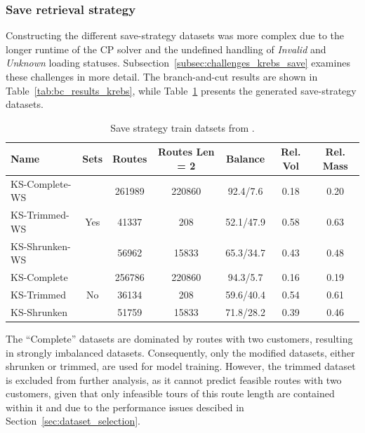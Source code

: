 \subsubsection{Save retrieval strategy}

Constructing the different save-strategy datasets was more complex due to the longer runtime of the \gls{CP} solver and the undefined
handling of \textit{Invalid} and \textit{Unknown} loading statuses. Subsection~\ref{subsec:challenges_krebs_save} examines these
challenges in more detail. The branch-and-cut results are shown in Table~\ref{tab:bc_results_krebs}, while
Table~\ref{tab:saved_instances_krebs} presents the generated save-strategy datasets.

\begin{table}[ht]
    \centering
    \small
    \begin{tabular}{l c c c c c c }
        \toprule
        Name           & Sets                 & Routes & Routes Len = 2 & Balance   & Rel. Vol & Rel. Mass \\
        \midrule
        KS-Complete-WS & \multirow{3}{*}{Yes} & 261989 & 220860         & 92.4/7.6  & 0.18     & 0.20      \\
        KS-Trimmed-WS  &                      & 41337  & 208            & 52.1/47.9 & 0.58     & 0.63      \\
        KS-Shrunken-WS &                      & 56962  & 15833          & 65.3/34.7 & 0.43     & 0.48      \\        \midrule
        KS-Complete    & \multirow{3}{*}{No}  & 256786 & 220860         & 94.3/5.7  & 0.16     & 0.19      \\
        KS-Trimmed     &                      & 36134  & 208            & 59.6/40.4 & 0.54     & 0.61      \\
        KS-Shrunken    &                      & 51759  & 15833          & 71.8/28.2 & 0.39     & 0.46      \\

        \bottomrule
    \end{tabular}
    \caption{Save strategy train datsets from \krebsADataSet.}
    \label{tab:saved_instances_krebs}
\end{table}

The “Complete” datasets are dominated by routes with two customers, resulting in strongly imbalanced datasets. Consequently,
only the modified datasets, either shrunken or trimmed, are used for model training. However, the trimmed dataset is excluded
from further analysis, as it cannot predict feasible routes with two customers, given that only infeasible tours of this route
length are contained within it and due to the performance issues descibed in Section~\ref{sec:dataset_selection}.


